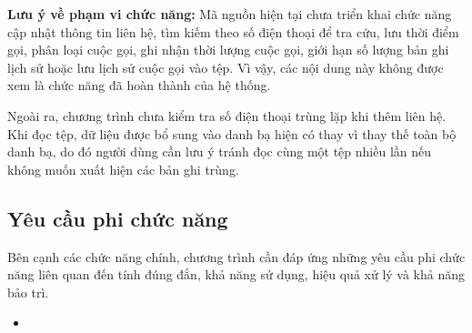 \documentclass[12pt,a4paper]{report}
\begin{document}
\noindent\textbf{Lưu ý về phạm vi chức năng:} Mã nguồn hiện tại chưa triển khai chức năng cập nhật thông tin liên hệ, tìm kiếm theo số điện thoại để tra cứu, lưu thời điểm gọi, phân loại cuộc gọi, ghi nhận thời lượng cuộc gọi, giới hạn số lượng bản ghi lịch sử hoặc lưu lịch sử cuộc gọi vào tệp. Vì vậy, các nội dung này không được xem là chức năng đã hoàn thành của hệ thống.\par
Ngoài ra, chương trình chưa kiểm tra số điện thoại trùng lặp khi thêm liên hệ. Khi đọc tệp, dữ liệu được bổ sung vào danh bạ hiện có thay vì thay thế toàn bộ danh bạ, do đó người dùng cần lưu ý tránh đọc cùng một tệp nhiều lần nếu không muốn xuất hiện các bản ghi trùng.\par
\subsection{Yêu cầu phi chức năng}

Bên cạnh các chức năng chính, chương trình cần đáp ứng những yêu cầu phi chức năng liên quan đến tính đúng đắn, khả năng sử dụng, hiệu quả xử lý và khả năng bảo trì.\par
\begin{itemize}[leftmargin=1.2cm]
\item 
\end{itemize}
\end{document}
